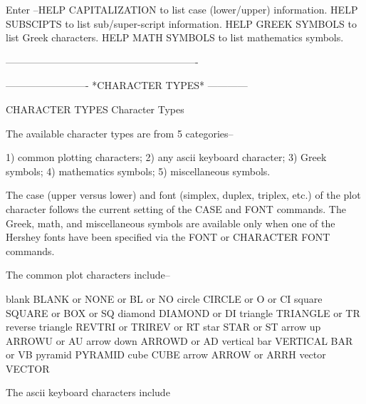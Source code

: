 Enter   --HELP CAPITALIZATION to list case (lower/upper) information.
          HELP SUBSCIPTS to list sub/super-script information.
          HELP GREEK SYMBOLS to list Greek characters.
          HELP MATH SYMBOLS to list mathematics symbols.
 
----------------------------------------------------------
 
 
 
 
 
 
 
 
 
 
 
 
 
 
 
 
 
 
 
 
 
 
 
 
-------------------------  *CHARACTER TYPES*  ------------
 
CHARACTER TYPES
Character Types
 
The available character types are from 5 categories--
 
   1) common plotting characters;
   2) any ascii keyboard character;
   3) Greek symbols;
   4) mathematics symbols;
   5) miscellaneous symbols.
 
The case (upper versus lower) and font (simplex, duplex, triplex, etc.)
of the plot character follows the current setting of the CASE and FONT
commands.  The Greek, math, and miscellaneous symbols are available
only when one of the Hershey fonts have been specified via the FONT or
CHARACTER FONT commands.
 
The common plot characters include--
 
   blank                BLANK or NONE or BL or NO
   circle               CIRCLE or O or CI
   square               SQUARE or BOX or SQ
   diamond              DIAMOND or DI
   triangle             TRIANGLE or TR
   reverse triangle     REVTRI or TRIREV or RT
   star                 STAR or ST
   arrow up             ARROWU or AU
   arrow down           ARROWD or AD
   vertical bar         VERTICAL BAR or VB
   pyramid              PYRAMID
   cube                 CUBE
   arrow                ARROW or ARRH
   vector               VECTOR
 
The ascii keyboard characters include
 
